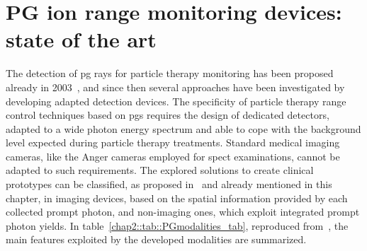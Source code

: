 \section{PG ion range monitoring devices: state of the art}\label{chap2::sec::PGdevices}

The detection of \gls{pg} rays for particle therapy monitoring has been proposed already in 2003~\parencite{Stichelbaut2003}, and since then several approaches have been investigated by developing adapted detection devices. The specificity of particle therapy range control techniques based on \glspl{pg} requires the design of dedicated detectors, adapted to a wide photon energy spectrum and able to cope with the background level expected during particle therapy treatments. Standard medical imaging cameras, like the Anger cameras employed for \gls{spect} examinations, cannot be adapted to such requirements. 
The explored solutions to create clinical prototypes can be classified, as proposed in~\cite{Krimmer2017} and already mentioned in this chapter, in imaging devices, based on the spatial information provided by each collected prompt photon, and non-imaging ones, which exploit integrated prompt photon yields. In table~\ref{chap2::tab::PGmodalities_tab}, reproduced from~\cite{Krimmer2017}, the main features exploited by the developed modalities are summarized.

\begin{table}[!htbp]
\centering
\caption{Characteristics of the \gls{pg} monitoring modalities. The star symbol represents mandatory measurements, the star in brackets means auxiliary but not mandatory measurements. Table reproduced from~\cite{Krimmer2017}.}
\label{chap2::tab::PGmodalities_tab}
\end{table}      

